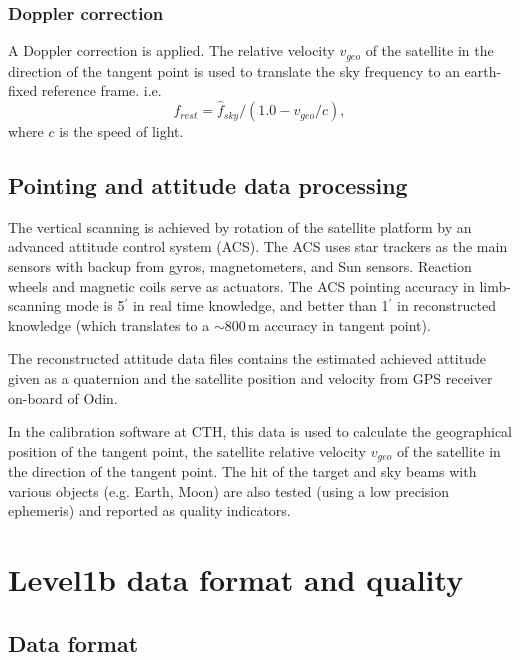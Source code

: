 

\subsection{Doppler correction}

A Doppler correction is applied.
The relative velocity \(v_{geo}\) of the satellite in the direction
of the tangent point is used to translate the sky frequency to an 
earth-fixed reference frame. i.e.
\begin{equation}
f_{rest} = \hat{f}_{sky}/(1.0 - v_{geo}/c),
\end{equation}
where \(c\) is the speed of light.

\section{Pointing and attitude data processing}

The vertical scanning is achieved by rotation of the satellite
platform by an advanced attitude control system (ACS). 
The ACS uses star trackers as the main sensors with backup from gyros, 
magnetometers, and Sun sensors. Reaction wheels and magnetic coils serve as 
actuators. The ACS pointing accuracy in limb-scanning mode is 5\(^{'}\) in
real time knowledge, and better than 1\(^{'}\) in reconstructed knowledge
(which translates to a \(\sim\)800\,m accuracy in tangent point).

The reconstructed attitude data files contains the estimated
achieved attitude given as a quaternion and the satellite position   
and velocity from GPS receiver on-board of Odin.

In the calibration software at CTH, this data is used to calculate
the geographical position of the tangent point, the satellite relative velocity 
\(v_{geo}\) of the satellite in the direction of the tangent point.
The hit of the target and sky beams with various objects (e.g. Earth, Moon) 
are also tested (using a low precision ephemeris)
and reported as quality indicators.


\chapter{Level1b data format and quality}



\section{Data format}


